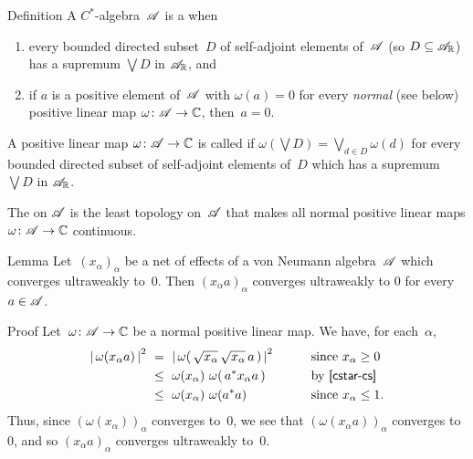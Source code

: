 \documentclass[main]{subfiles}
\begin{document}
%
%
\begin{parsec}[vna]%
\begin{point}{Definition}%
A $C^*$-algebra~$\mathscr{A}$
is a 
when
\begin{enumerate}
\item
every bounded directed subset~$D$
of self-adjoint elements of~$\mathscr{A}$ (so $D\subseteq \mathscr{A}_{\mathbb{R}}$) 
has a supremum $\bigvee D$ in $\mathscr{A}_{\mathbb{R}}$, and
\item
if $a$ is a positive element of~$\mathscr{A}$
with $\omega(a)=0$ for every \emph{normal} (see below) positive 
linear map $\omega\colon \mathscr{A}\to \mathbb{C}$,
then~$a=0$.
\end{enumerate}
\begin{point}%
A positive linear map $\omega\colon \mathscr{A}\to \mathbb{C}$
is called 
if $\omega(\bigvee D) = \bigvee_{d\in D} \omega(d)$
for every bounded directed subset of self-adjoint elements of~$D$
which has a supremum $\bigvee D$ in $\mathscr{A}_{\mathbb{R}}$.
\end{point}%
\begin{point}%
The  on $\mathscr{A}$
is the least topology on~$\mathscr{A}$
that makes all normal positive linear maps $\omega\colon \mathscr{A}\to \mathbb{C}$
continuous.
\end{point}
\end{point}
\end{parsec}
%
%
\begin{parsec}%
\begin{point}{Lemma}%
Let~$(x_\alpha)_\alpha$ be 
a net of effects of a von Neumann algebra~$\mathscr{A}$
which converges ultraweakly to~$0$.
Then $(x_\alpha a)_\alpha$ converges ultraweakly
to $0$ for every~$a\in\mathscr{A}$.
\end{point}
\begin{point}{Proof}%
Let~$\omega\colon \mathscr{A}\to \mathbb{C}$ be a normal positive linear map.
We have, for each~$\alpha$,
\begin{alignat*}{3}
\left|\,\omega(x_\alpha a)\,\right|^2
\ &=\ 
\left|\, \omega(\,\sqrt{x_\alpha}\,\sqrt{x_\alpha}\,a\,)\, \right|^2
\qquad&&\text{since $x_\alpha\geq 0$}\\
\ &\leq\ 
\omega(x_\alpha)\  \omega(\,a^* x_\alpha a\,) 
\qquad&&\text{by \sref{cstar-cs}}\\
\ &\leq\ 
\omega(x_\alpha)\ \omega(a^*a)
\qquad&&\text{since $x_\alpha\leq 1$}.
\end{alignat*}
Thus,
since $(\omega(x_\alpha))_\alpha$
converges to~$0$,
we see that $(\omega(x_\alpha a))_\alpha$
converges to~$0$,
and so $(x_\alpha a)_\alpha$ converges ultraweakly to~$0$.
\end{point}
\end{parsec}
\end{document}

